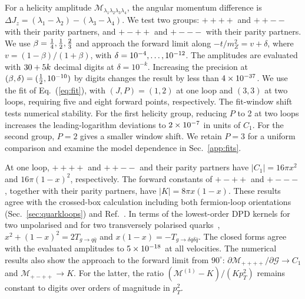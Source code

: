 \documentclass[%
 onecolumn,
 superscriptaddress,
 preprintnumbers,
 nofootinbib,
 amsmath,amssymb,
 aps,
 prl,
]{revtex4-2}
\newcommand{\G}{\mathcal G}
\newcommand{\M}{\mathcal M}
\newcommand{\hel}[4]{{#1}{#2}{#3}{#4}}
\begin{document}
For a helicity amplitude
$\M_{\lambda_1\lambda_2\lambda_3\lambda_4}$,
the angular momentum difference is
$\Delta J_z=(\lambda_1-\lambda_2)
-(\lambda_3-\lambda_4)$.
We test two groups: $\hel++++$ and
$\hel++--$ with their parity partners,
and $\hel+-++$ and $\hel+---$
with their parity partners.
%
We use $\beta=\frac14,\frac12,\frac23$ and approach the
forward limit along
$-t/m_Z^2=v+\delta$, where
$v=(1-\beta)/(1+\beta)$, with
$\delta=10^{-4},\ldots,10^{-12}$.
The amplitudes are evaluated with
$30+5 k$
decimal digits at $\delta=10^{-k}$.
Increasing the precision at
$(\beta,\delta)=(\frac12,10^{-10})$
by \zzCtrlExtraDigits{} digits changes
the result by less than $4\times10^{-37}$.
%
We use the fit of Eq.~(\ref{eq:fit}),
with $(J,P)=(1,2)$ at one loop
and $(3,3)$ at two loops, requiring
five and eight forward points,
respectively. The fit-window shift
tests numerical stability.
For the first helicity group, reducing
$P$ to 2 at two loops increases the
leading-logarithm deviations to
$2\times10^{-7}$ in units of $C_1$.
For the second group, $P=2$ gives a
smaller window shift. We retain $P=3$
for a uniform comparison and examine
the model dependence in Sec.~\ref{app:fits}.
%

%
At one loop, $\hel++++$ and $\hel++--$
and their parity partners have
$|C_1|=16\pi x^2$ and
$16\pi(1-x)^2$, respectively.
The forward constants of $\hel+-++$
and $\hel+---$, together with their
parity partners, have
$|K|=8\pi x(1-x)$.
These results agree with the crossed-box
calculation including both fermion-loop
orientations (Sec.~\ref{sec:quarkloops})
and Ref.~\cite{Gaunt:2011xd}.
In terms of the lowest-order DPD kernels for
two unpolarised and for two transversely polarised
quarks~\cite{Diehl:2014vaa},
$x^2+(1-x)^2=2T_{g\to q\bar q}$ and
$x(1-x)=-T_{g\to\delta q\delta\bar q}$.
The closed forms agree with the evaluated
amplitudes to $5\times10^{-18}$ at all
\zzVelocityCount{} velocities.
%
The numerical results also show the approach
to the forward limit from $90^\circ$:
$\partial\M_{\hel++++}/\partial\G\to C_1$
and $\M_{\hel+-++}\to K$.
For the latter, the ratio
$(\M^{(1)}-K)/(Kp_T^2)$ remains
constant to \zzFwdDigits{} digits
over \zzFwdDecades{} orders of magnitude
in $p_T^2$.
\end{document}
